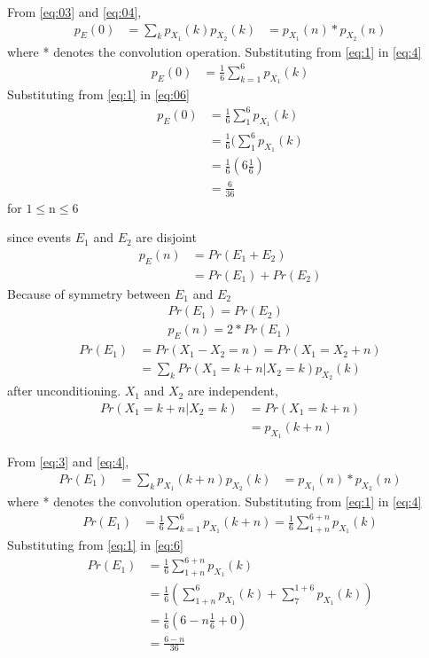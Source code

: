 \documentclass[journal,12pt,twocolumn]{IEEEtran}
\begin{document}
From \eqref{eq:03} and \eqref{eq:04},
\begin{align}
   p_E(0)  &=\sum_{k}p_{X_{1}}(k)p_{X_{2}}(k)
  &= p_{X_{1}}(n)*p_{X_{2}}(n)\label{eq:05}
\end{align}
where * denotes the convolution operation. Substituting from \eqref{eq:1} in \eqref{eq:4}
\begin{align}
   p_E(0)  &=\frac{1}{6}\sum_{k=1}^{6}p_{X_{1}}(k)\label{eq:06}
\end{align}
Substituting from \eqref{eq:1} in \eqref{eq:06}
\begin{align}
   p_E(0)  &=\frac{1}{6}\sum_{1}^{6}p_{X_{1}}(k)\nonumber\\
  &=\frac{1}{6}(\sum_{1}^{6}p_{X_{1}}(k)\nonumber\\
   &=\frac{1}{6}(6\frac{1}{6})\nonumber\\
    &=\frac{6}{36}\nonumber
\end{align}
for $1\leq  $n$\leq 6$ 

since events $E_1$ and $E_2$ are disjoint
\begin{align}
	p_E(n)&=Pr(E_1+E_2) \nonumber\\
	&=Pr(E_1)+Pr(E_2)\nonumber
\end{align}
Because of symmetry between $E_1$ and $E_2$ 
\begin{align}
	Pr(E_1)=Pr(E_2) \nonumber\\	
	p_E(n)=2*Pr(E_1)\nonumber	
\end{align}
\begin{align}
    Pr(E_1) &= Pr (X_1-X_2 = n) = Pr (X_1 = X_2+n )\nonumber\\
   	&=\sum_{k} Pr(X_1=k+n|X_2=k)p_{X_{2}}(k)\label{eq:3}
\end{align}
after unconditioning. $X_1$ and $X_2$ are independent,
\begin{align}
	Pr(X_1=k+n|X_2=k)&=Pr(X_1=k+n)\nonumber\\
                &=p_{X_{1}}(k+n)\label{eq:4}
\end{align} 

From \eqref{eq:3} and \eqref{eq:4},
\begin{align}
  Pr(E_1) &=\sum_{k}p_{X_{1}}(k+n)p_{X_{2}}(k)
  &= p_{X_{1}}(n)*p_{X_{2}}(n)\label{eq:5}
\end{align}
where * denotes the convolution operation. Substituting from \eqref{eq:1} in \eqref{eq:4}
\begin{align}
  Pr(E_1) &=\frac{1}{6}\sum_{k=1}^{6}p_{X_{1}}(k+n)=\frac{1}{6}\sum_{1+n}^{6+n}p_{X_{1}}(k)\label{eq:6}
\end{align}
Substituting from \eqref{eq:1} in \eqref{eq:6}
\begin{align}
  Pr(E_1) &=\frac{1}{6}\sum_{1+n}^{6+n}p_{X_{1}}(k)\nonumber\\
  &=\frac{1}{6}(\sum_{1+n}^{6}p_{X_{1}}(k)+\sum_{7}^{1+6}p_{X_{1}}(k))\nonumber\\
   &=\frac{1}{6}(6-n\frac{1}{6}+0)\nonumber\\
    &=\frac{6-n}{36}\nonumber
\end{align} 
\end{document}
